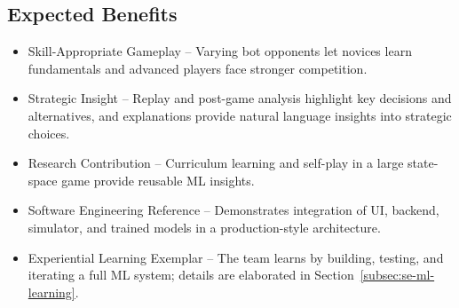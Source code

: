\documentclass{article}
\begin{document}
\subsection{Expected Benefits}\label{subsec:expected-benefits}
\begin{itemize}
    \item {Skill-Appropriate Gameplay} – Varying bot opponents let novices learn fundamentals and advanced players face stronger competition.
    \item {Strategic Insight} – Replay and post-game analysis highlight key decisions and alternatives, and \LLM{} explanations provide natural language insights into strategic choices.
    \item {\AI{} Research Contribution} – Curriculum learning and self-play in a large state-space game provide reusable ML insights.
    \item {Software Engineering Reference} – Demonstrates integration of UI, backend, simulator, and trained models in a production-style architecture.
    \item {Experiential Learning Exemplar} – The team learns by building, testing, and iterating a full ML system; details are elaborated in Section~\ref{subsec:se-ml-learning}.
\end{itemize}
\end{document}
